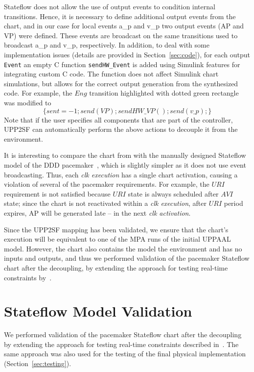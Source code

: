 Stateflow does not allow the use of output events to condition internal transitions. Hence, it is necessary to define additional output events from the chart, and in our case for local events a\_p and v\_p two output events (AP and VP) were defined. These events are broadcast on the same transitions used to broadcast a\_p and v\_p, respectively. In addition, to deal with some implementation issues (details are provided in Section~\ref{sec:code}), for each output \texttt{Event} an empty C function \texttt{sendHW\_Event} is added using Simulink features for integrating custom C code. The function does not affect Simulink chart simulations, but allows for the correct output generation from the synthesized code. For example, the $Eng$ transition highlighted with dotted green rectangle was modified to 
\begin{equation*}
[(sent==3)]\{sent=-1;send(VP);sendHW\_VP();send(v\_p);\}
\end{equation*}
Note that if the user specifies all components that are part of the controller, UPP2SF can automatically perform the above actions to decouple it from the environment.


It is interesting to compare the chart from  with the manually designed Stateflow model of the DDD pacemaker~\cite{vhm_ecrts10}, which is slightly simpler as it does not use event broadcasting. Thus, each \textit{clk execution} has a single chart activation, causing a violation of several of the pacemaker requirements. For example, the $URI$ requirement is not satisfied because $URI$ state is always scheduled after $AVI$ state; since the chart is not reactivated within a \textit{clk execution}, after $URI$ period expires, AP will be generated late -- in the next \textit{clk activation}.


Since the UPP2SF mapping has been validated, we ensure that the chart's execution will be equivalent to one of the MPA runs of the initial UPPAAL model. However, the chart also contains the model the environment and has no inputs and outputs, and thus we performed validation of the pacemaker Stateflow chart after the decoupling, by extending the approach for testing real-time constraints by~\cite{ClarkeLee}. 
\section{Stateflow Model Validation}
\label{sec:valSF}

We performed validation of the pacemaker Stateflow chart after the decoupling by extending the approach for testing real-time constraints described in~\cite{ClarkeLee}. The same approach was also used for the testing of the final physical implementation (Section~\ref{sec:testing}).

